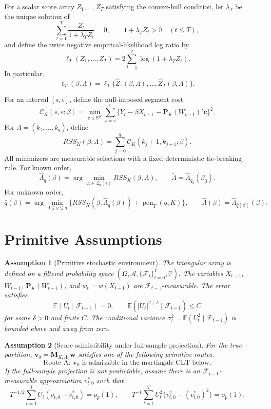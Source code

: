 \documentclass[12pt]{article}
\numberwithin{equation}{section}
\newtheorem{assumption}{Assumption}
\theoremstyle{definition}
\newcommand{\R}{\mathbb R}
\newcommand{\E}{\mathbb E}
\newcommand{\Pp}{\mathbb P}
\newcommand{\F}{\mathcal F}
\begin{document}
For a scalar score array \(Z_1,\ldots,Z_T\) satisfying the convex-hull
condition, let \(\lambda_T\) be the unique solution of
\[
    \sum_{t=1}^T\frac{Z_t}{1+\lambda_T Z_t}=0,
    \qquad
    1+\lambda_T Z_t>0\quad(t\leq T),
\]
and define the twice negative empirical-likelihood log ratio by
\begin{equation}
    \ell_T(Z_1,\ldots,Z_T)
    =2\sum_{t=1}^T\log(1+\lambda_TZ_t).
    \label{eq:sol-el-definition}
\end{equation}
In particular,
\[
    \ell_T(\beta,\Lambda)
    =\ell_T\{\widehat Z_1(\beta,\Lambda),\ldots,
                    \widehat Z_T(\beta,\Lambda)\}.
\]

For an interval \([s,e]\), define the null-imposed segment cost
\[
    \mathcal C_K(s,e;\beta)
    =
    \min_{\bm c\in\R^K}
    \sum_{t=s}^e
    \{Y_t-\beta X_{t-1}-\bm P_K(W_{t-1})'\bm c\}^2.
\]
For \(\Lambda=(k_1,\ldots,k_q)\), define
\[
    RSS_K(\beta,\Lambda)
    =
    \sum_{j=0}^q
    \mathcal C_K(k_j+1,k_{j+1};\beta).
\]
All minimizers are measurable selections with a fixed deterministic tie-breaking rule. For known order,
\[
    \widehat\Lambda_q(\beta)
    =
    \arg\min_{\Lambda\in\mathcal L_q(\epsilon)}
    RSS_K(\beta,\Lambda),
    \qquad
    \widetilde\Lambda=\widehat\Lambda_{q_0}(\beta_0).
\]
For unknown order,
\[
    \widehat q(\beta)
    =
    \arg\min_{0\leq q\leq \bar q}
    \{RSS_K(\beta,\widehat\Lambda_q(\beta))+\operatorname{pen}_T(q,K)\},
    \qquad
    \widehat\Lambda(\beta)=\widehat\Lambda_{\widehat q(\beta)}(\beta).
\]

\section{Primitive Assumptions}

\begin{assumption}[Primitive stochastic environment]
\label{ass:prim-stoch}
The triangular array is defined on a filtered probability space
\((\Omega,\mathcal A,\{\F_t\}_{t=0}^T,\Pp)\). The variables \(X_{t-1}\), \(W_{t-1}\), \(\bm P_K(W_{t-1})\), and \(w_t=w(X_{t-1})\) are \(\F_{t-1}\)-measurable. The error satisfies
\[
    \E(U_t\mid \F_{t-1})=0,
    \qquad
    \E(|U_t|^{2+\delta}\mid \F_{t-1})\leq C
\]
for some \(\delta>0\) and finite \(C\). The conditional variance \(\sigma_t^2=\E(U_t^2\mid\F_{t-1})\) is bounded above and away from zero.
\end{assumption}

\begin{assumption}[Score admissibility under full-sample projection]
\label{ass:prim-score-admissible}
For the true partition, \(\bm v_0=\bm M_{K,\Lambda_0}\bm w\) satisfies one of the following primitive routes.
\[
    \text{Route A: } \bm v_0 \text{ is admissible in the martingale CLT below.}
\]
If the full-sample projection is not predictable, assume there is an
\(\F_{t-1}\)-measurable approximation \(v_{t,0}^\ast\) such that
\[
    T^{-1/2}\sum_{t=1}^T U_t(v_{t,0}-v_{t,0}^\ast)=o_p(1),
    \qquad
    T^{-1}\sum_{t=1}^T U_t^2\{v_{t,0}^2-(v_{t,0}^\ast)^2\}=o_p(1).
\]
\end{assumption}
\end{document}

